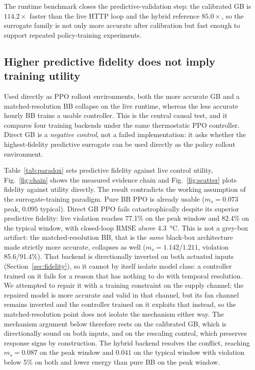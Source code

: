 \documentclass{ieeeaccess}
\newcommand{\RMSE}{\ensuremath{\mathrm{RMSE}}}
\newcommand{\ms}{\ensuremath{m_s}}
\begin{document}
The runtime benchmark closes the predictive-validation step: the calibrated GB is $114.2\times$
faster than the live HTTP loop and the hybrid reference $85.0\times$, so the surrogate family is not
only more accurate after calibration but fast enough to support repeated policy-training
experiments.

\subsection{Higher predictive fidelity does not imply training utility}\label{sec:paradox}

Used directly as PPO rollout environments, both the more accurate GB and a matched-resolution BB
collapse on the live runtime, whereas the less accurate hourly BB trains a usable controller. This
is the central causal test, and it compares four training backends under the same thermostatic PPO
controller. Direct GB is a \emph{negative control}, not a failed implementation: it asks whether the
highest-fidelity predictive surrogate can be used directly as the policy rollout environment.

Table~\ref{tab:paradox} sets predictive fidelity against live control utility, Fig.~\ref{fig:chain}
shows the measured evidence chain and Fig.~\ref{fig:scatter} plots fidelity against utility
directly. The result contradicts the working assumption of the surrogate-training paradigm. Pure BB
PPO is already usable ($\ms=0.073$ peak, $0.095$ typical). Direct GB PPO fails catastrophically
despite its superior predictive fidelity: live violation reaches 77.1\% on the peak window and
82.4\% on the typical window, with closed-loop \RMSE{} above \SI{4.3}{\celsius}. This is not a
grey-box artifact: the matched-resolution BB, that is the \emph{same} black-box architecture made
strictly more accurate, collapses as well ($\ms=1.142$/$1.211$, violation 85.6/91.4\%). That backend
is directionally inverted on both actuated inputs (Section~\ref{sec:fidelity}), so it cannot by
itself isolate model class: a controller trained on it fails for a reason that has nothing to do
with temporal resolution. We attempted to repair it with a training constraint on the supply
channel; the repaired model is more accurate and valid in that channel, but its fan channel remains
inverted and the controller trained on it exploits that instead, so the matched-resolution point
does not isolate the mechanism either way. The mechanism argument below therefore rests on the
calibrated GB, which is directionally sound on both inputs, and on the rescaling control, which
preserves response signs by construction. The hybrid
backend resolves the conflict, reaching $\ms=0.087$ on the peak window and $0.041$ on the typical
window with violation below 5\% on both and lower energy than pure BB on the peak window.
\end{document}
